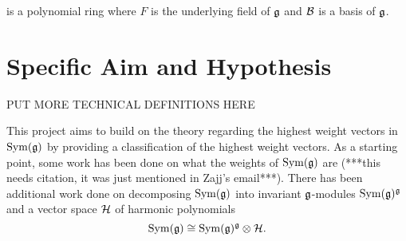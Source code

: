 \documentclass[11pt, reqno]{amsart}
\begin{document}
%
%
%


is a polynomial ring where $F$ is the underlying field of $\mathfrak{g}$ and $\mathcal{B}$ is a basis of $\mathfrak{g}$.








\section{Specific Aim and Hypothesis}

PUT MORE TECHNICAL DEFINITIONS HERE

This project aims to build on the theory regarding the highest weight vectors in $\operatorname{Sym}(\mathfrak{g})$ by providing a classification of the highest weight vectors.  As a starting point, some work has been done on what the weights of $\operatorname{Sym}(\mathfrak{g})$ are (***this needs citation, it was just mentioned in Zajj's email***). There has been additional work done on decomposing $\operatorname{Sym}(\mathfrak{g})$ into invariant $\mathfrak{g}$-modules $\operatorname{Sym}(\mathfrak{g})^{\mathfrak{g}}$ and a vector space $\mathcal{H}$ of harmonic polynomials \cite[(3.10)]{NeRa2004}
\[\operatorname{Sym}(\mathfrak{g})\cong\operatorname{Sym}(\mathfrak{g})^{\mathfrak{g}}\otimes\mathcal{H}.\] 
\end{document}
